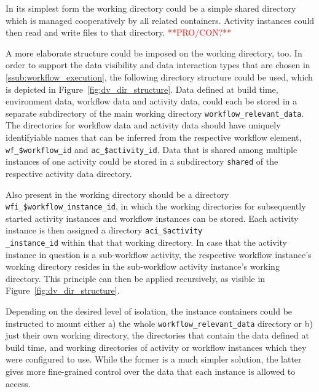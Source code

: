 
    In its simplest form the working directory could be a simple shared directory which is managed cooperatively by all related containers. Activity instances could then read and write files to that directory.
    \textcolor{red}{**PRO/CON?**}

    A more elaborate structure could be imposed on the working directory, too. In order to support the data visibility and data interaction types that are chosen in \ref{ssub:workflow_execution}, the following directory structure could be used, which is depicted in Figure~\ref{fig:dv_dir_structure}.
    Data defined at build time, \ie environment data, workflow data and activity data, could each be stored in a separate subdirectory of the main working directory \texttt{workflow\_relevant\_data}. The directories for workflow data and activity data should have uniquely identifyiable names that can be inferred from the respective workflow element, \eg \texttt{wf\_\$workflow\_id} and \texttt{ac\_\$activity\_id}. Data that is shared among multiple instances of one activity could be stored in a subdirectory \texttt{shared} of the respective activity data directory.

    Also present in the working directory should be a directory \texttt{wfi\_\$workflow\_instance\_id}, in which the working directories for subsequently started activity instances and workflow instances can be stored. Each activity instance is then assigned a directory \texttt{aci\_\$activity\\\_instance\_id} within that that working directory. In case that the activity instance in question is a sub-workflow activity, the respective workflow instance's working directory resides in the sub-workflow activity instance's working directory. This principle can then be applied recursively, as visible in Figure~\ref{fig:dv_dir_structure}.

    Depending on the desired level of isolation, the instance containers could be instructed to mount either a) the whole \texttt{workflow\_relevant\_data} directory or b) just their own working directory, the directories that contain the data defined at build time, and working directories of activity or workflow instances which they were configured to use. While the former is a much simpler solution, the latter gives more fine-grained control over the data that each instance is allowed to access.

